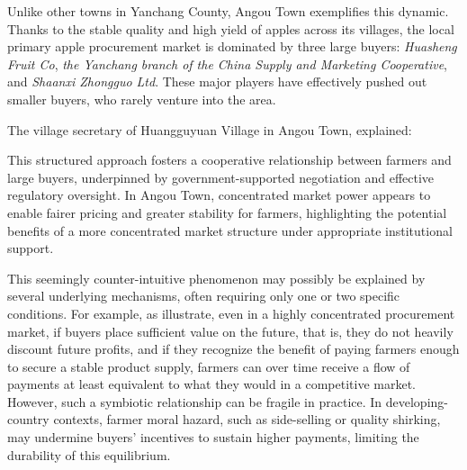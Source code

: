 Unlike other towns in Yanchang County, Angou Town exemplifies this dynamic. Thanks to the stable quality and high yield of apples across its villages, the local primary apple procurement market is dominated by three large buyers: \textit{Huasheng Fruit Co}, \textit{the Yanchang branch of the China Supply and Marketing Cooperative}, and \textit{Shaanxi Zhongguo Ltd}. These major players have effectively pushed out smaller buyers, who rarely venture into the area.

The village secretary of Huangguyuan Village in Angou Town, explained:
\begin{quote}
\end{quote}
This structured approach fosters a cooperative relationship between farmers and large buyers, underpinned by government-supported negotiation and effective regulatory oversight. In Angou Town, concentrated market power appears to enable fairer pricing and greater stability for farmers, highlighting the potential benefits of a more concentrated market structure under appropriate institutional support.


This seemingly counter-intuitive phenomenon may possibly be explained by several underlying mechanisms, often requiring only one or two specific conditions. For example, as \citet{sexton2018increasing} illustrate, even in a highly concentrated procurement market, if buyers place sufficient value on the future, that is, they do not heavily discount future profits, and if they recognize the benefit of paying farmers enough to secure a stable product supply, farmers can over time receive a flow of payments at least equivalent to what they would in a competitive market. However, such a symbiotic relationship can be fragile in practice. In developing-country contexts, farmer moral hazard, such as side-selling or quality shirking, may undermine buyers' incentives to sustain higher payments, limiting the durability of this equilibrium.



